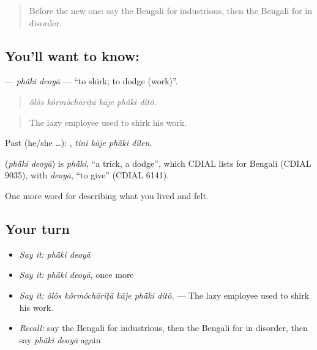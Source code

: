 \label{lesson:BN-C462-phaki-deoya}



\begin{quote}
Before the new one: say the Bengali for industrious, then the Bengali for in disorder.
\end{quote}

\subsection*{You'll want to know:  }
\textbf{ } — \emph{phā̃ki deoyā} — \textquotedblleft{}to shirk; to dodge (work)\textquotedblright{}.

\begin{quote}
    
\end{quote}

\begin{quote}
\emph{ôlôs kôrmôchārīṭā kāje phā̃ki ditô.}
\end{quote}

\begin{quote}
The lazy employee used to shirk his work.
\end{quote}

Past (he/she …):    , \emph{tini kāje phā̃ki dilen}.

\begin{cousinweb}
\textbf{ } (\emph{phā̃ki deoyā}) is \emph{phā̃ki}, \textquotedblleft{}a trick, a dodge\textquotedblright{}, which CDIAL lists for Bengali (CDIAL 9035), with \emph{deoyā}, \textquotedblleft{}to give\textquotedblright{} (CDIAL 6141).
\end{cousinweb}

\begin{grammarlens}[title={What you've built}]
One more word for describing what you lived and felt.
\end{grammarlens}

\subsection*{Your turn}
\begin{itemize}
\raggedright
  \item \emph{Say it:} \emph{phā̃ki deoyā}
  \item \emph{Say it:} \emph{phā̃ki deoyā}, once more
  \item \emph{Say it:} \emph{ôlôs kôrmôchārīṭā kāje phā̃ki ditô.} — The lazy employee used to shirk his work.
  \item \emph{Recall:} say the Bengali for industrious, then the Bengali for in disorder, then say \emph{phā̃ki deoyā} again
\end{itemize}

